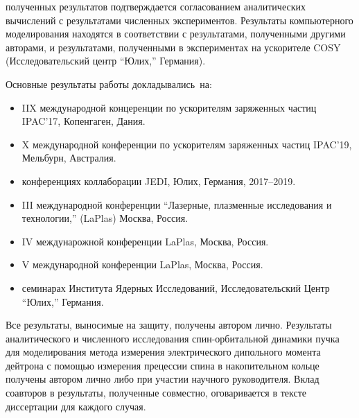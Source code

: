 \begin{enumerate}
\end{enumerate}

{\reliability} полученных результатов подтверждается согласованием аналитических вычислений с результатами численных экспериментов. Результаты компьютерного моделирования находятся в соответствии с результатами, полученными другими авторами, и результатами, полученными в экспериментах на ускорителе COSY (Исследовательский центр ``Юлих,'' Германия).


{\probation}
Основные результаты работы докладывались~на:
\begin{itemize}
\item IIX международной концеренции по ускорителям заряженных частиц IPAC'17, Копенгаген, Дания.
\item X международной конференции по ускорителям заряженных частиц IPAC'19, Мельбурн, Австралия.
\item конференциях коллаборации JEDI, Юлих, Германия, 2017--2019.
\item III международной конференции ``Лазерные, плазменные исследования и технологии,'' (LaPlas) Москва, Россия. 
\item IV междунарожной конференции LaPlas, Москва, Россия.
\item V международной конференции LaPlas, Москва, Россия.
\item семинарах Института Ядерных Исследований, Исследовательский Центр ``Юлих,'' Германия.
\end{itemize}

{\contribution} Все результаты, выносимые на защиту, получены автором лично. Результаты аналитического и численного исследования спин-орбитальной динамики пучка для моделирования метода измерения электрического дипольного момента дейтрона с помощью измерения прецессии спина в накопительном кольце получены автором лично либо при участии научного руководителя. Вклад соавторов в результаты, полученные совместно, оговаривается в тексте диссертации для каждого случая.

